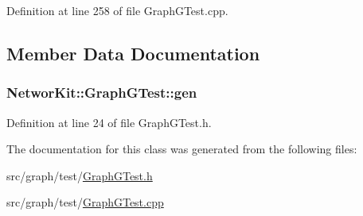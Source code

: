 Definition at line 258 of file Graph\-G\-Test.\-cpp.



\subsection{Member Data Documentation}
\hypertarget{class_networ_kit_1_1_graph_g_test_ae04f864deaaf9ef28e20a883d5a0e7db}{
\subsubsection[{gen}]{ Networ\-Kit\-::\-Graph\-G\-Test\-::gen\hspace{0.3cm}{\ttfamily [protected]}}}\label{class_networ_kit_1_1_graph_g_test_ae04f864deaaf9ef28e20a883d5a0e7db}


Definition at line 24 of file Graph\-G\-Test.\-h.



The documentation for this class was generated from the following files\-:\begin{DoxyCompactItemize}
\item 
src/graph/test/\hyperlink{_graph_g_test_8h}{Graph\-G\-Test.\-h}\item 
src/graph/test/\hyperlink{_graph_g_test_8cpp}{Graph\-G\-Test.\-cpp}\end{DoxyCompactItemize}

